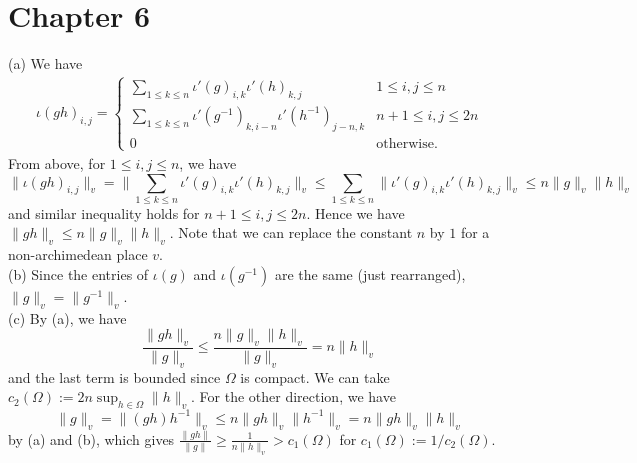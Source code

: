 \newpage
\section{Chapter 6}

\begin{problem} \notfinish
\end{problem}

\begin{problem}
(a) We have
\begin{align*}
    \iota(gh)_{i,j} = \begin{cases}
        \sum_{1\leq k \leq n} \iota'(g)_{i, k}\iota'(h)_{k, j} & 1\leq i, j \leq n \\ 
        \sum_{1\leq k \leq n} \iota'(g^{-1})_{k, i-n}\iota'(h^{-1})_{j-n, k} & n+1 \leq i, j \leq 2n \\
        0 & \text{otherwise}.
    \end{cases}
\end{align*}
From above, for $1 \leq i, j \leq n$, we have
$$
\|\iota(gh)_{i, j} \|_v = \bigg\| \sum_{1\leq k \leq n} \iota'(g)_{i, k} \iota'(h)_{k, j}\bigg\|_v 
\leq\sum_{1\leq k \leq n} \| \iota'(g)_{i, k} \iota'(h)_{k, j}  \|_v \leq n \|g\|_v \|h\|_v
$$
and similar inequality holds for $n+1 \leq i, j \leq 2n$. Hence we have $\|gh\|_{v} \leq n \|g\|_v \|h\|_v$. 
Note that we can replace the constant $n$ by $1$ for a non-archimedean place $v$. \\
(b) Since the entries of $\iota(g)$ and $\iota(g^{-1})$ are the same (just rearranged), $\|g\|_v = \|g^{-1}\|_v$. \\
(c) By (a), we have 
$$
\frac{\|gh\|_v}{\|g\|_v} \leq \frac{n\|g\|_v\|h\|_v}{\|g\|_v} = n\|h\|_v
$$
and the last term is bounded since $\Omega$ is compact. We can take $c_2(\Omega):= 2n\sup_{h\in \Omega}\|h\|_v$.
For the other direction, we have
$$
\|g\|_v = \|(gh)h^{-1}\|_v \leq n \|gh\|_v \|h^{-1}\|_v = n \|gh\|_v \|h\|_v
$$
by (a) and (b), which gives $\frac{\|gh\|}{\|g\|} \geq \frac{1}{n\|h\|_v} > c_1(\Omega)$ for $c_1(\Omega):= 1/c_2(\Omega)$.
\end{problem}

\begin{problem} \notfinish
\end{problem}


\begin{problem} \notfinish
\end{problem}


\begin{problem} \notfinish
\end{problem}


